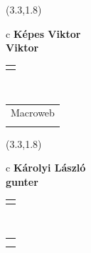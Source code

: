 \documentclass[11pt]{article}
\begin{document}
\makebox(3.3,1.8){
  \renewcommand\arraystretch{1.3}
  \begin{tabular}[c]{c}
    \hspace{8.5mm}
    \LARGE\bf{ Képes Viktor }\\
    \hspace{8.5mm}
    \Large{ Viktor }\\
    \renewcommand\arraystretch{3}
    \begin{tabular}[c]{c}
      \centering
      \fontfamily{phv}\selectfont{
        \textbf{
          \textsc{
            \scriptsize{
            \color{Bright}{ Ismerkedő }\color{Dark}{ Webmester }\color{Dark}{ Sminkmester }\color{Bright}{ Programozó }
            }
          }
        }
      }
    \end{tabular}
    \\
    \renewcommand\arraystretch{1}
    \begin{tabular}{p{3.3in}}
      \hspace{.7cm}Macroweb\\
      \hspace{.7cm}\emph{  }\\
    \end{tabular}
  \end{tabular}
}

\makebox(3.3,1.8){
  \renewcommand\arraystretch{1.3}
  \begin{tabular}[c]{c}
    \hspace{8.5mm}
    \LARGE\bf{ Károlyi László }\\
    \hspace{8.5mm}
    \Large{ gunter }\\
    \renewcommand\arraystretch{3}
    \begin{tabular}[c]{c}
      \centering
      \fontfamily{phv}\selectfont{
        \textbf{
          \textsc{
            \scriptsize{
            \color{Bright}{ Ismerkedő }\color{Dark}{ Webmester }\color{Dark}{ Sminkmester }\color{Bright}{ Programozó }
            }
          }
        }
      }
    \end{tabular}
    \\
    \renewcommand\arraystretch{1}
    \begin{tabular}{p{3.3in}}
      \hspace{.7cm}\\
      \hspace{.7cm}\emph{  }\\
    \end{tabular}
  \end{tabular}
}
\end{document}

